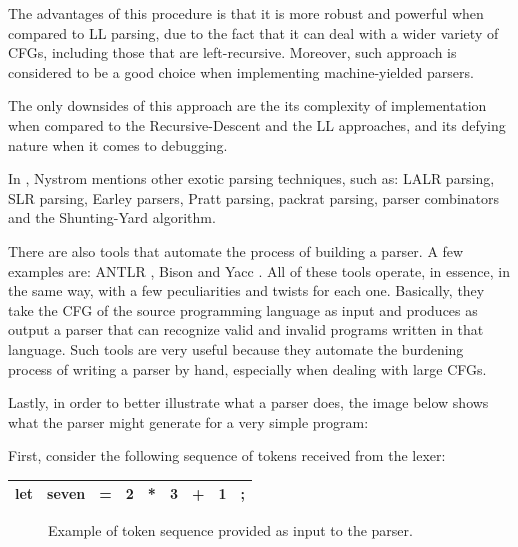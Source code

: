 \begin{itemize}
\begin{itemize}
            The advantages of this procedure is that it is more robust and powerful when compared to LL parsing, due to the fact that it can deal with a wider variety of CFGs, including those that are left-recursive. Moreover, such approach is considered to be a good choice when implementing machine-yielded parsers.

            The only downsides of this approach are the its complexity of implementation when compared to the Recursive-Descent and the LL approaches, and its defying nature when it comes to debugging.
            
        \end{itemize}
\end{itemize}

In \cite{nystrom2021crafting}, Nystrom mentions other exotic parsing techniques, such as: LALR parsing, SLR parsing, Earley parsers, Pratt parsing, packrat parsing, parser combinators and the Shunting-Yard algorithm.

There are also tools that automate the process of building a parser. A few examples are: ANTLR \cite{ANTLR}, Bison \cite{Bison} and Yacc \cite{Yacc}. All of these tools operate, in essence, in the same way, with a few peculiarities and twists for each one. Basically, they take the CFG of the source programming language as input and produces as output a parser that can recognize valid and invalid programs written in that language. Such tools are very useful because they automate the burdening process of writing a parser by hand, especially when dealing with large CFGs.

Lastly, in order to better illustrate what a parser does, the image below shows what the parser might generate for a very simple program:

First, consider the following sequence of tokens received from the lexer:

\begin{table}[H]
    \centering
    \begin{tabular}{|c|c|c|c|c|c|c|c|c|}
        \hline
        let & seven & = & 2 & * & 3 & + & 1 & ; \\
        \hline
    \end{tabular}
\end{table}

\begin{figure}[H]  
  \caption{Example of token sequence provided as input to the parser.}
  \label{fig:inputParser}
\end{figure}

